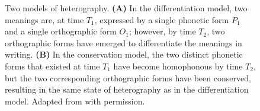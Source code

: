 \documentclass[doc,biblatex]{apa7}
\begin{document}
	\begin{figure}
	\vspace*{2pt}
	\caption{Two models of heterography. \textbf{(A)} In the differentiation model, two meanings are, at time $T_1$, expressed by a single phonetic form $P_1$ and a single orthographic form $O_1$; however, by time $T_2$, two orthographic forms have emerged to differentiate the meanings in writing. \textbf{(B)} In the conservation model, the two distinct phonetic forms that existed at time $T_1$ have become homophonous by time $T_2$, but the two corresponding orthographic forms have been conserved, resulting in the same state of heterography as in the differentiation model. Adapted from \textcite[pp.~325--326]{Berg:2021} with permission.}
	\label{models_of_heterography}
	\end{figure}
\end{document}
